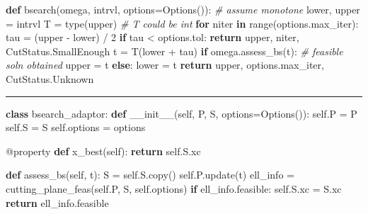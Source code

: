 \documentclass[
]{article}
\newenvironment{Shaded}{}{}
\newcommand{\AttributeTok}[1]{\textcolor[rgb]{0.49,0.56,0.16}{#1}}
\newcommand{\BuiltInTok}[1]{\textcolor[rgb]{0.00,0.50,0.00}{#1}}
\newcommand{\CommentTok}[1]{\textcolor[rgb]{0.38,0.63,0.69}{\textit{#1}}}
\newcommand{\ControlFlowTok}[1]{\textcolor[rgb]{0.00,0.44,0.13}{\textbf{#1}}}
\newcommand{\DecValTok}[1]{\textcolor[rgb]{0.25,0.63,0.44}{#1}}
\newcommand{\FunctionTok}[1]{\textcolor[rgb]{0.02,0.16,0.49}{#1}}
\newcommand{\KeywordTok}[1]{\textcolor[rgb]{0.00,0.44,0.13}{\textbf{#1}}}
\newcommand{\NormalTok}[1]{#1}
\newcommand{\OperatorTok}[1]{\textcolor[rgb]{0.40,0.40,0.40}{#1}}
\newcommand{\VariableTok}[1]{\textcolor[rgb]{0.10,0.09,0.49}{#1}}
\begin{document}
\begin{Shaded}
\begin{Highlighting}[]
\KeywordTok{def}\NormalTok{ bsearch(omega, intrvl, options}\OperatorTok{=}\NormalTok{Options()):}
    \CommentTok{\# assume monotone}
\NormalTok{    lower, upper }\OperatorTok{=}\NormalTok{ intrvl}
\NormalTok{    T }\OperatorTok{=} \BuiltInTok{type}\NormalTok{(upper)  }\CommentTok{\# T could be \textasciigrave{}int\textasciigrave{}}
    \ControlFlowTok{for}\NormalTok{ niter }\KeywordTok{in} \BuiltInTok{range}\NormalTok{(options.max\_iter):}
\NormalTok{        tau }\OperatorTok{=}\NormalTok{ (upper }\OperatorTok{{-}}\NormalTok{ lower) }\OperatorTok{/} \DecValTok{2}
        \ControlFlowTok{if}\NormalTok{ tau }\OperatorTok{\textless{}}\NormalTok{ options.tol:}
            \ControlFlowTok{return}\NormalTok{ upper, niter, CutStatus.SmallEnough}
\NormalTok{        t }\OperatorTok{=}\NormalTok{ T(lower }\OperatorTok{+}\NormalTok{ tau)}
        \ControlFlowTok{if}\NormalTok{ omega.assess\_bs(t):  }\CommentTok{\# feasible sol\textquotesingle{}n obtained}
\NormalTok{            upper }\OperatorTok{=}\NormalTok{ t}
        \ControlFlowTok{else}\NormalTok{:}
\NormalTok{            lower }\OperatorTok{=}\NormalTok{ t}
    \ControlFlowTok{return}\NormalTok{ upper, options.max\_iter, CutStatus.Unknown}
\end{Highlighting}
\end{Shaded}

\begin{center}\rule{0.5\linewidth}{0.5pt}\end{center}

\begin{Shaded}
\begin{Highlighting}[]
\KeywordTok{class}\NormalTok{ bsearch\_adaptor:}
    \KeywordTok{def} \FunctionTok{\_\_init\_\_}\NormalTok{(}\VariableTok{self}\NormalTok{, P, S, options}\OperatorTok{=}\NormalTok{Options()):}
        \VariableTok{self}\NormalTok{.P }\OperatorTok{=}\NormalTok{ P}
        \VariableTok{self}\NormalTok{.S }\OperatorTok{=}\NormalTok{ S}
        \VariableTok{self}\NormalTok{.options }\OperatorTok{=}\NormalTok{ options}

    \AttributeTok{@property}
    \KeywordTok{def}\NormalTok{ x\_best(}\VariableTok{self}\NormalTok{):}
        \ControlFlowTok{return} \VariableTok{self}\NormalTok{.S.xc}

    \KeywordTok{def}\NormalTok{ assess\_bs(}\VariableTok{self}\NormalTok{, t):}
\NormalTok{        S }\OperatorTok{=} \VariableTok{self}\NormalTok{.S.copy()}
        \VariableTok{self}\NormalTok{.P.update(t)}
\NormalTok{        ell\_info }\OperatorTok{=}\NormalTok{ cutting\_plane\_feas(}\VariableTok{self}\NormalTok{.P, S, }\VariableTok{self}\NormalTok{.options)}
        \ControlFlowTok{if}\NormalTok{ ell\_info.feasible:}
            \VariableTok{self}\NormalTok{.S.xc }\OperatorTok{=}\NormalTok{ S.xc}
        \ControlFlowTok{return}\NormalTok{ ell\_info.feasible}
\end{Highlighting}
\end{Shaded}
\end{document}
